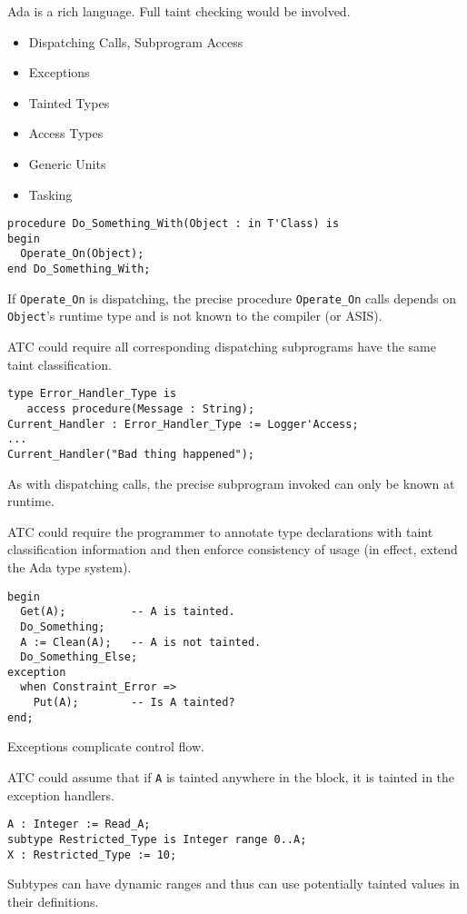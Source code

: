\documentclass[landscape]{slides}
\begin{document}
Ada is a rich language. Full taint checking would be involved.
\begin{itemize}
\item Dispatching Calls, Subprogram Access
\item Exceptions
\item Tainted Types
\item Access Types
\item Generic Units
\item Tasking
\end{itemize}
\stopslide


\begin{verbatim}
procedure Do_Something_With(Object : in T'Class) is
begin
  Operate_On(Object);
end Do_Something_With;
\end{verbatim}
If \texttt{Operate\_On} is dispatching, the precise procedure \texttt{Operate\_On} calls depends
on \texttt{Object}'s runtime type and is not known to the compiler (or ASIS).

ATC could require all corresponding dispatching subprograms have the same taint classification.
\stopslide

\begin{verbatim}
type Error_Handler_Type is
   access procedure(Message : String);
Current_Handler : Error_Handler_Type := Logger'Access;
...
Current_Handler("Bad thing happened");
\end{verbatim}
As with dispatching calls, the precise subprogram invoked can only be known at runtime.

ATC could require the programmer to annotate type declarations with taint classification
information and then enforce consistency of usage (in effect, extend the Ada type system).
\stopslide

\begin{verbatim}
begin
  Get(A);          -- A is tainted.
  Do_Something;
  A := Clean(A);   -- A is not tainted.
  Do_Something_Else;
exception
  when Constraint_Error =>
    Put(A);        -- Is A tainted?
end;
\end{verbatim}
Exceptions complicate control flow.

ATC could assume that if \texttt{A} is tainted anywhere in the block, it is tainted in the
exception handlers.
\stopslide

\begin{verbatim}
A : Integer := Read_A;
subtype Restricted_Type is Integer range 0..A;
X : Restricted_Type := 10;
\end{verbatim}
Subtypes can have dynamic ranges and thus can use potentially tainted values in their
definitions.
\end{document}
